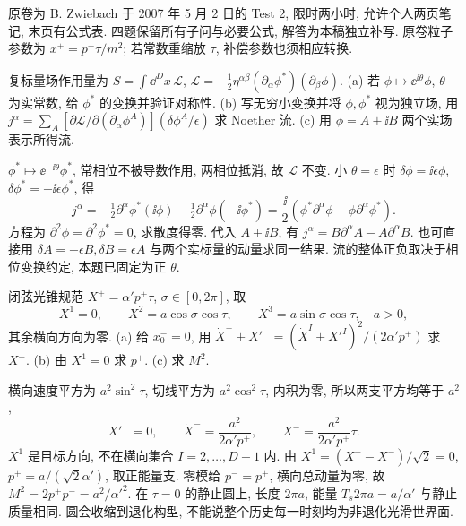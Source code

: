 原卷为 B. Zwiebach 于 2007 年 5 月 2 日的 Test 2, 限时两小时, 允许个人两页笔记, 末页有公式表. 四题保留所有子问与必要公式, 解答为本稿独立补写. 原卷粒子参数为 $x^+=p^+\tau/m^2$; 若常数重缩放 $\tau$, 补偿参数也须相应转换.

\begin{exercise}
复标量场作用量为 $S=\int\dd^Dx\,\mathcal L$,
$\mathcal L=-\frac12\eta^{\alpha\beta}(\partial_\alpha\phi^*)(\partial_\beta\phi)$.
(a) 若 $\phi\mapsto\ee^{\ii\theta}\phi$, $\theta$ 为实常数, 给 $\phi^*$ 的变换并验证对称性.
(b) 写无穷小变换并将 $\phi,\phi^*$ 视为独立场, 用 $j^\alpha=\sum_A[\partial\mathcal L/\partial(\partial_\alpha\phi^A)](\delta\phi^A/\epsilon)$ 求 Noether 流.
(c) 用 $\phi=A+\ii B$ 两个实场表示所得流.
\end{exercise}
\begin{solution}
$\phi^*\mapsto\ee^{-\ii\theta}\phi^*$, 常相位不被导数作用, 两相位抵消, 故 $\mathcal L$ 不变. 小 $\theta=\epsilon$ 时 $\delta\phi=\ii\epsilon\phi$, $\delta\phi^*=-\ii\epsilon\phi^*$, 得
\[
 j^\alpha=-\tfrac12\partial^\alpha\phi^*(\ii\phi)
 -\tfrac12\partial^\alpha\phi(-\ii\phi^*)
 =\frac\ii2(\phi^*\partial^\alpha\phi-\phi\partial^\alpha\phi^*).
\]
方程为 $\partial^2\phi=\partial^2\phi^*=0$, 求散度得零. 代入 $A+\ii B$, 有
$j^\alpha=B\partial^\alpha A-A\partial^\alpha B$.
也可直接用 $\delta A=-\epsilon B,\delta B=\epsilon A$ 与两个实标量的动量求同一结果. 流的整体正负取决于相位变换约定, 本题已固定为正 $\theta$.
\end{solution}

\begin{exercise}
闭弦光锥规范 $X^+=\alpha'p^+\tau$, $\sigma\in[0,2\pi]$, 取
\[
 X^1=0,\qquad X^2=a\cos\sigma\cos\tau,\qquad
 X^3=a\sin\sigma\cos\tau,\quad a>0,
\]
其余横向方向为零. (a) 给 $x_0^-=0$, 用
$\dot X^-\pm X'^-=(\dot X^I\pm X'^I)^2/(2\alpha'p^+)$ 求 $X^-$.
(b) 由 $X^1=0$ 求 $p^+$.
(c) 求 $M^2$.
\end{exercise}
\begin{solution}
横向速度平方为 $a^2\sin^2\tau$, 切线平方为 $a^2\cos^2\tau$, 内积为零, 所以两支平方均等于 $a^2$,
\[
 X'^-=0,\qquad \dot X^-=\frac{a^2}{2\alpha'p^+},
 \qquad X^-=\frac{a^2}{2\alpha'p^+}\tau.
\]
$X^1$ 是目标方向, 不在横向集合 $I=2,\ldots,D-1$ 内.
由 $X^1=(X^+-X^-)/\sqrt2=0$, $p^+=a/(\sqrt2\alpha')$, 取正能量支. 零模给 $p^-=p^+$, 横向总动量为零, 故
$M^2=2p^+p^-=a^2/\alpha'^2$.
在 $\tau=0$ 的静止圆上, 长度 $2\pi a$, 能量 $T_s2\pi a=a/\alpha'$ 与静止质量相同. 圆会收缩到退化构型, 不能说整个历史每一时刻均为非退化光滑世界面.
\end{solution}

